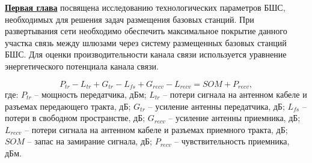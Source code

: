 




\underline{\textbf{Первая глава}} посвящена исследованию технологических параметров БШС, необходимых для решения задач размещения базовых станций. При развертывания сети необходимо обеспечить максимальное покрытие данного участка связь между шлюзами через систему размещенных базовых станций БШС. Для оценки производительности канала связи используется уравнение энергетического потенциала канала связи. 

\begin{equation}
\label{eq:part3_link_budget}
P_{tr} - L_{tr} + G_{tr} - L_{fs} + G_{recv} - L_{recv} = SOM + P_{recv},
\end{equation}
где: $P_{tr}$ -- мощность передатчика, дБм; $L_{tr}$ -- потери сигнала на антенном кабеле и разъемах передающего тракта, дБ; $G_{tr}$ -- усиление антенны передатчика, дБ; $L_{fs}$ -- потери в свободном пространстве, дБ; $G_{recv}$ -- усиление антенны приемника, дБ; $L_{recv}$ -- потери сигнала на антенном кабеле и разъемах приемного тракта, дБ; $SOM$ -- запас на замирание сигнала, дБ; $P_{recv}$ -- чувствительность приемника, дБм.


